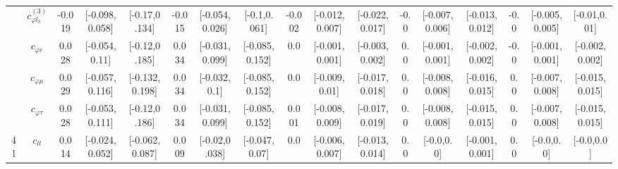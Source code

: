 \documentclass{article}
\begin{document}
\begin{table}[H]
\begin{tabular}{|c|c|c|c|c|c|c|c|c|c|c|c|c|c|c|c|c|}
 & $c_{\varphi l_3}^{(3)}$ & -0.019                             & [-0.098,0.058]                                 & [-0.17,0.134] & -0.015                             & [-0.054,0.026]                                 & [-0.1,0.061] & -0.002                             & [-0.012,0.007]                                 & [-0.022,0.017] & -0.0                             & [-0.007,0.006]                                 & [-0.013,0.012] & -0.0                             & [-0.005,0.005]                                 & [-0.01,0.01] \\ \cline{2-17}
 & $c_{\varphi e}$ & 0.028                             & [-0.054,0.11]                                 & [-0.12,0.185] & 0.034                             & [-0.031,0.099]                                 & [-0.085,0.152] & 0.0                             & [-0.001,0.001]                                 & [-0.003,0.002] & 0.0                             & [-0.001,0.001]                                 & [-0.002,0.002] & -0.0                             & [-0.001,0.001]                                 & [-0.002,0.002] \\ \cline{2-17}
 & $c_{\varphi \mu}$ & 0.029                             & [-0.057,0.116]                                 & [-0.132,0.198] & 0.034                             & [-0.032,0.1]                                 & [-0.085,0.152] & 0.0                             & [-0.009,0.01]                                 & [-0.017,0.018] & 0.0                             & [-0.008,0.008]                                 & [-0.016,0.015] & 0.0                             & [-0.007,0.008]                                 & [-0.015,0.015] \\ \cline{2-17}
 & $c_{\varphi \tau}$ & 0.028                             & [-0.053,0.111]                                 & [-0.12,0.186] & 0.034                             & [-0.031,0.099]                                 & [-0.085,0.152] & 0.001                             & [-0.008,0.009]                                 & [-0.017,0.019] & 0.0                             & [-0.008,0.008]                                 & [-0.015,0.015] & 0.0                             & [-0.007,0.008]                                 & [-0.015,0.015] \\ \cline{2-17}
\hline
\multirow{1}{*}{4l}
 & $c_{ll}$ & 0.014                             & [-0.024,0.052]                                 & [-0.062,0.087] & 0.009                             & [-0.02,0.038]                                 & [-0.047,0.07] & 0.0                             & [-0.006,0.007]                                 & [-0.013,0.014] & 0.0                             & [-0.0,0.0]                                 & [-0.001,0.001] & 0.0                             & [-0.0,0.0]                                 & [-0.0,0.0] \\ \cline{2-17}

\end{tabular}
\end{table}
\end{document}
